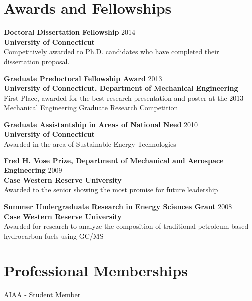 \vspace{0.5em}

\section{Awards and Fellowships}

\begin{lonelist}
   \item[] \textbf{Doctoral Dissertation Fellowship} \hfill 2014\\
           \textbf{University of Connecticut}\\
           Competitively awarded to Ph.D. candidates who have completed
           their dissertation proposal.
   \item[] \textbf{Graduate Predoctoral Fellowship Award} \hfill 2013\\
           \textbf{University of Connecticut, Department of Mechanical
                   Engineering}\\
            First Place, awarded for the best research presentation and
            poster at the 2013 Mechanical Engineering Graduate Research
            Competition
   \item[] \textbf{Graduate Assistantship in Areas of National
                   Need} \hfill 2010\\
           \textbf{University of Connecticut}\\
            Awarded in the area of Sustainable Energy Technologies

   \item[] \textbf{Fred H. Vose Prize, Department of Mechanical and
                   Aerospace Engineering} \hfill 2009\\
           \textbf{Case Western Reserve University}\\
           Awarded to the senior showing the most promise for future
           leadership

   \item[] \textbf{Summer Undergraduate Research in Energy Sciences
                   Grant} \hfill 2008\\
           \textbf{Case Western Reserve University}\\
           Awarded for research to analyze the composition of
           traditional petroleum-based hydrocarbon fuels using GC/MS
\end{lonelist}

\section{Professional Memberships}
AIAA - Student Member

